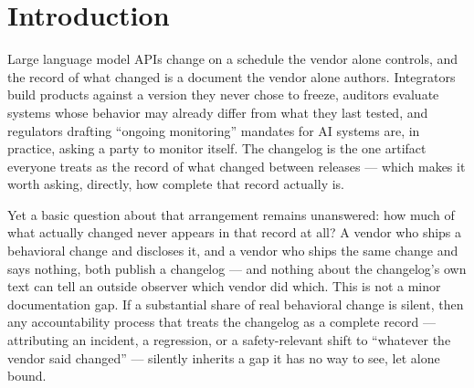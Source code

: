 \documentclass[11pt]{article}
\begin{document}
\section{Introduction}

Large language model APIs change on a schedule the vendor alone controls, and the record of what changed is a document the vendor alone authors. Integrators build products against a version they never chose to freeze, auditors evaluate systems whose behavior may already differ from what they last tested, and regulators drafting ``ongoing monitoring'' mandates for AI systems are, in practice, asking a party to monitor itself. The changelog is the one artifact everyone treats as the record of what changed between releases --- which makes it worth asking, directly, how complete that record actually is.

Yet a basic question about that arrangement remains unanswered: how much of what actually changed never appears in that record at all? A vendor who ships a behavioral change and discloses it, and a vendor who ships the same change and says nothing, both publish a changelog --- and nothing about the changelog's own text can tell an outside observer which vendor did which. This is not a minor documentation gap. If a substantial share of real behavioral change is silent, then any accountability process that treats the changelog as a complete record --- attributing an incident, a regression, or a safety-relevant shift to ``whatever the vendor said changed'' --- silently inherits a gap it has no way to see, let alone bound.
\end{document}
